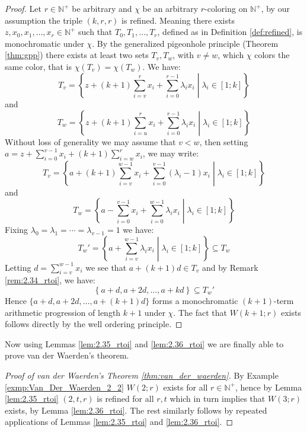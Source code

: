 \begin{proof}
	Let $r \in \mathbb{N}^{+}$ be arbitrary and $\chi$ be an arbitrary $r$-coloring on $\mathbb{N}^{+}$, by our assumption the triple $(k, r, r)$ is refined. Meaning there exists $z, x_0, x_1, \ldots, x_{r} \in \mathbb{N}^{+}$ such that $T_0, T_1, \ldots, T_{r}$, defined as in Definition \ref{def:refined}, is monochromatic under $\chi$. By the generalized pigeonhole principle (Theorem \ref{thm:gpp}) there exists at least two sets $T_v, T_w$, with $v \neq w$, which $\chi$ colors the same color, that is $\chi(T_v) = \chi(T_w)$. We have:
	\begin{equation*}
		T_v = \left\{ z + (k + 1)\sum_{i = v}^{r} x_{i} + \sum_{i = 0}^{r - 1} \lambda_ix_i \middle| \lambda_i \in [1;k]\right\}
	\end{equation*}
	and
	\begin{equation*}
		T_w = \left\{ z + (k + 1)\sum_{i = u}^{r} x_{i} + \sum_{i = 0}^{r - 1} \lambda_ix_i \middle| \lambda_i \in [1;k]\right\}
	\end{equation*}
	Without loss of generality we may assume that $v < w$, then setting $a = z + \sum_{i = 0}^{v - 1} x_i + (k + 1) \sum_{i = w}^{r} x_{i}$, we may write:
	\begin{equation*}
		T_v = \left\{a + (k + 1) \sum_{i = v}^{w - 1} x_i + \sum_{i = 0}^{v - 1} (\lambda_i - 1) x_i \middle| \lambda_i \in [1; k]\right\}
	\end{equation*}
	and
	\begin{equation*}
		T_w = \left\{a - \sum_{i = 0}^{v - 1} x_i + \sum_{i = 0}^{w - 1} \lambda_i x_i \middle| \lambda_i \in [1; k]\right\}
	\end{equation*}
	Fixing $\lambda_0 = \lambda_1 = \cdots = \lambda_{v - 1} = 1$ we have:
	\begin{equation*}
		T_w' = \left\{a + \sum_{i = v}^{w - 1} \lambda_i x_i \middle| \lambda_i \in [1; k]\right\} \subseteq T_{w}
	\end{equation*}
	Letting $d = \sum_{i = v}^{w - 1} x_i$ we see that $a + (k + 1)d \in T_v$ and by Remark \ref{rem:2.34_rtoi}, we have:
	\begin{equation*}
		\left\{a + d, a + 2d, \ldots, a + kd\right\} \subseteq T_w'
	\end{equation*}
	Hence $\{a + d, a + 2d, \ldots, a + (k + 1)d\}$ forms a monochromatic $(k + 1)$-term arithmetic progression of length $k + 1$ under $\chi$. The fact that $W(k + 1; r)$ exists follows directly by the well ordering principle.
\end{proof}

Now using Lemmas \ref{lem:2.35_rtoi} and \ref{lem:2.36_rtoi} we are finally able to prove van der Waerden's theorem.
\begin{proof}[Proof of van der Waerden's Theorem \ref{thm:van_der_waerden}]
	By Example \ref{exmp:Van_Der_Waerden_2_2} $W(2; r)$ exists for all $r \in \mathbb{N}^+$, hence by Lemma \ref{lem:2.35_rtoi} $(2, t, r)$ is refined for all $r, t$ which in turn implies that $W(3; r)$ exists, by Lemma \ref{lem:2.36_rtoi}. The rest similarly follows by repeated applications of Lemmas \ref{lem:2.35_rtoi} and \ref{lem:2.36_rtoi}.
\end{proof}
